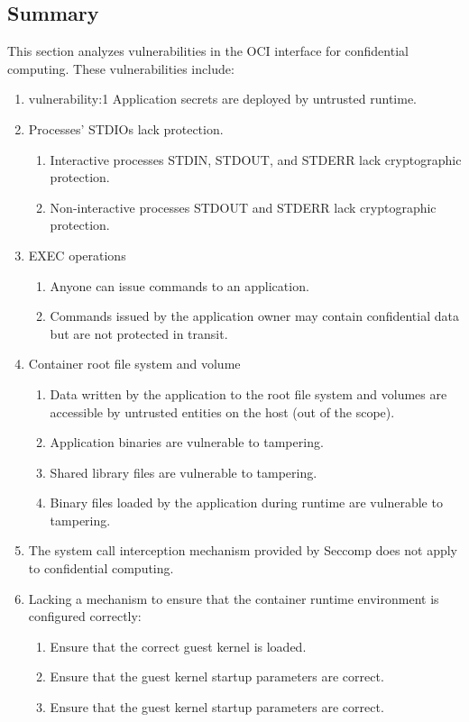 \subsection{Summary}
\label{sec:security_analyse_oci_summary}
This section analyzes vulnerabilities in the OCI interface for confidential computing. These vulnerabilities include:
 \begin{enumerate}
  \item{vulnerability:1} Application secrets are deployed by untrusted runtime.
  \item Processes' STDIOs lack protection.
      \begin{enumerate}
          \item\label{vulnerabilities:2} Interactive processes STDIN, STDOUT, and STDERR lack cryptographic protection.
          \item\label{vulnerabilities:3} Non-interactive processes STDOUT and STDERR lack cryptographic protection.
      \end{enumerate}
  \item EXEC operations
      \begin{enumerate}
        \item\label{vulnerabilities:4} Anyone can issue commands to an application.
        \item\label{vulnerabilities:5} Commands issued by the application owner may contain confidential data but are not protected in transit.
      \end{enumerate}
  \item Container root file system and volume
      \begin{enumerate}
        \item\label{vulnerabilities:6} Data written by the application to the root file system and volumes are accessible by untrusted entities on the host (out of the scope).
        \item\label{vulnerabilities:7} Application binaries are vulnerable to tampering.
        \item\label{vulnerabilities:8} Shared library files are vulnerable to tampering.
        \item\label{vulnerabilities:9} Binary files loaded by the application during runtime are vulnerable to tampering.
      \end{enumerate}
  \item\label{vulnerabilities:10} The system call interception mechanism provided by Seccomp does not apply to confidential computing.
  \item Lacking a mechanism to ensure that the container runtime environment is configured correctly:
      \begin{enumerate}
        \item\label{vulnerabilities:11} Ensure that the correct guest kernel is loaded.
        \item\label{vulnerabilities:12} Ensure that the guest kernel startup parameters are correct.
        \item\label{vulnerabilities:13}  Ensure that the guest kernel startup parameters are correct.
      \end{enumerate}
\end{enumerate}


